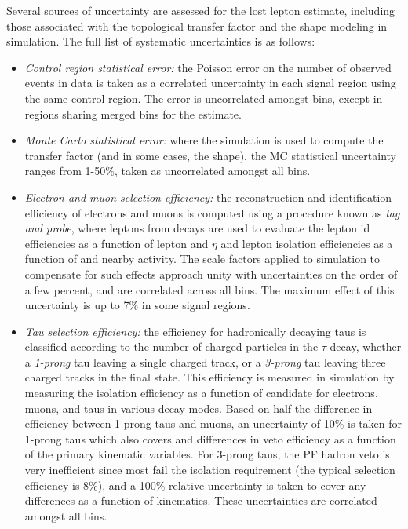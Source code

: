 Several sources of uncertainty are assessed for the lost lepton estimate, including those associated with the topological transfer factor and the \mttwo shape modeling in simulation. The full list of systematic uncertainties is as follows:
\begin{itemize}
	\item {\it Control region statistical error:} the Poisson error on the number of observed events in data is taken as a correlated uncertainty in each signal region using the same control region. The error is uncorrelated amongst \mttwo bins, except in regions sharing merged \mttwo bins for the estimate.
	\item {\it Monte Carlo statistical error:} where the simulation is used to compute the transfer factor (and in some cases, the \mttwo shape), the MC statistical uncertainty ranges from 1-50\%, taken as uncorrelated amongst all bins.
	\item {\it Electron and muon selection efficiency:} the reconstruction and identification efficiency of electrons and muons is computed using a procedure known as {\it tag and probe}, where leptons from \Zll decays are used to evaluate the lepton id efficiencies as a function of lepton \pt and $\eta$ and lepton isolation efficiencies as a function of \pt and nearby activity. The scale factors applied to simulation to compensate for such effects approach unity with uncertainties on the order of a few percent, and are correlated across all bins. The maximum effect of this uncertainty is up to 7\% in some signal regions.
	\item {\it Tau selection efficiency:} the efficiency for hadronically decaying taus is classified according to the number of charged particles in the $\tau$ decay, whether a {\it 1-prong} tau leaving a single charged track, or a {\it 3-prong} tau leaving three charged tracks in the final state. This efficiency is measured in simulation by measuring the isolation efficiency as a function of candidate \pt for electrons, muons, and taus in various decay modes. Based on half the difference in efficiency between 1-prong taus and muons, an uncertainty of 10\% is taken for 1-prong taus which also covers and differences in veto efficiency as a function of the primary kinematic variables. For 3-prong taus, the PF hadron veto is very inefficient since most fail the isolation requirement (the typical selection efficiency is 8\%), and a 100\% relative uncertainty is taken to cover any differences as a function of kinematics. These uncertainties are correlated amongst all bins.

\end{itemize}

